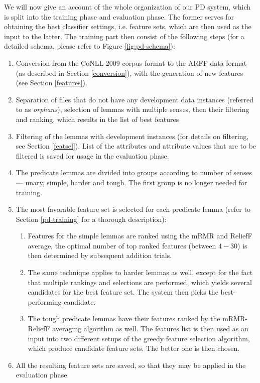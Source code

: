 \documentclass[12pt,notitlepage]{report}
\begin{document}
We will now give an account of the whole organization of our PD system, which is split into the training phase and evaluation phase. The former serves for obtaining the best classifier settings, i.e. feature sets, which are then used as the input to the latter. The training part then consist of the following steps (for a detailed schema, please refer to Figure \ref{fig:pd-schema}):
\begin{enumerate}
    \item Conversion from the CoNLL 2009 corpus format to the ARFF data format (as described in Section \ref{conversion}), with the generation of new features (see Section \ref{features}).
    \item Separation of files that do not have any development data instances (referred to as \emph{orphans}), selection of lemmas with multiple senses, then their filtering and ranking, which results in the list of best features
    \item Filtering of the lemmas with development instances (for details on filtering, see Section \ref{featsel}). List of the attributes and attribute values that are to be filtered is saved for usage in the evaluation phase.
    \item The predicate lemmas are divided into groups according to number of senses --- unary, simple, harder and tough. The first group is no longer needed for training.
    \item The most favorable feature set is selected for each predicate lemma (refer to Section \ref{pd-training} for a thorough description):
    \begin{enumerate}
        \item Features for the simple lemmas are ranked using the mRMR and ReliefF average, the optimal number of top ranked features (between $4-30$) is then determined by subsequent addition trials.
        \item The same technique applies to harder lemmas as well, except for the fact that multiple rankings and selections are performed, which yields several candidates for the best feature set. The system then picks the best-performing candidate.
        \item The tough predicate lemmas have their features ranked by the mRMR-ReliefF averaging algorithm as well. The features list is then used as an input into two different setups of the greedy feature selection algorithm, which produce candidate feature sets. The better one is then chosen.
    \end{enumerate}
    \item All the resulting feature sets are saved, so that they may be applied in the evaluation phase.
\end{enumerate}
\end{document}
